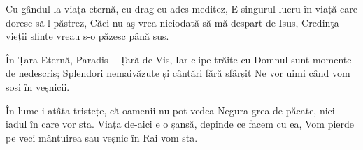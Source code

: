 \beginverse
Cu gândul la viața eternă, cu drag eu ades meditez,
E singurul lucru în viață care doresc să-l păstrez,
Căci nu aş vrea niciodată să mă despart de Isus,
Credinţa vieții sfinte vreau s-o păzesc până sus.
\endverse

\beginchorus
În Țara Eternă, Paradis – Țară de Vis,
Iar clipe trăite cu Domnul sunt momente de nedescris;
Splendori nemaivăzute și cântări fără sfârșit
Ne vor uimi când vom sosi în veșnicii.
\endchorus

\beginverse
În lume-i atâta tristețe, că oamenii nu pot vedea
Negura grea de păcate, nici iadul în care vor sta.
Viața de-aici e o șansă, depinde ce facem cu ea,
Vom pierde pe veci mântuirea sau veșnic în Rai vom sta.
\endverse
\endsong